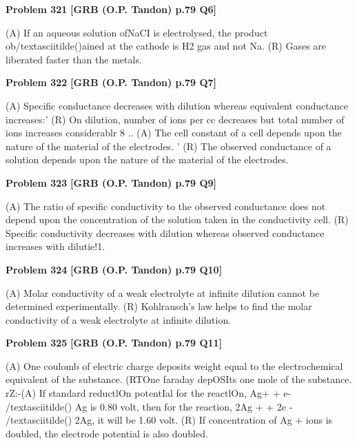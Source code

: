 \begin{problembox}
\textbf{Problem 321} \hfill \textbf{[GRB (O.P. Tandon) p.79 Q6]}
\label{q:ext-grb_all_questions-321}

(A) If an aqueous solution ofNaCI is electrolysed, the product 
ob/textasciitilde()ained at the cathode is H2 gas and not Na. 
(R) Gases are liberated faster than the metals.
\end{problembox}

\begin{problembox}
\textbf{Problem 322} \hfill \textbf{[GRB (O.P. Tandon) p.79 Q7]}
\label{q:ext-grb_all_questions-322}

(A) Specific conductance decreases with dilution whereas 
equivalent conductance increases:' 
(R) On dilution, number of ions per cc decreases but total 
number of ions increases considerablr 
8 .. (A) The cell constant of a cell depends upon the nature of the 
material of the electrodes. 
' 
(R) The observed conductance of a solution depends upon the 
nature of the material of the electrodes.
\end{problembox}

\begin{problembox}
\textbf{Problem 323} \hfill \textbf{[GRB (O.P. Tandon) p.79 Q9]}
\label{q:ext-grb_all_questions-323}

(A) The ratio of specific conductivity to the observed 
conductance does not depend upon the concentration of 
the solution taken in the conductivity cell. 
(R) Specific conductivity decreases with dilution whereas 
observed conductance increases with dilutie!1.
\end{problembox}

\begin{problembox}
\textbf{Problem 324} \hfill \textbf{[GRB (O.P. Tandon) p.79 Q10]}
\label{q:ext-grb_all_questions-324}

(A) Molar conductivity of a weak electrolyte at infinite 
dilution cannot be determined experimentally. 
(R) Kohlrausch's law helps to find the molar conductivity of a 
weak electrolyte at infinite dilution.
\end{problembox}

\begin{problembox}
\textbf{Problem 325} \hfill \textbf{[GRB (O.P. Tandon) p.79 Q11]}
\label{q:ext-grb_all_questions-325}

(A) One coulomb of electric charge deposits weight equal to 
the electrochemical equivalent of the substance. 
(RTOne faraday depOSIts one mole of the substance. 
rZ:-(A) If 
standard reductlOn potentIal 
for 
the reactlOn, 
Ag+ + e- /textasciitilde() 
Ag is 0.80 volt, then for the reaction, 
2Ag + + 2e - /textasciitilde() 
2Ag, it will be 1.60 volt. 
(R) If concentration of Ag + ions is doubled, the electrode 
potential is also doubled.
\end{problembox}

